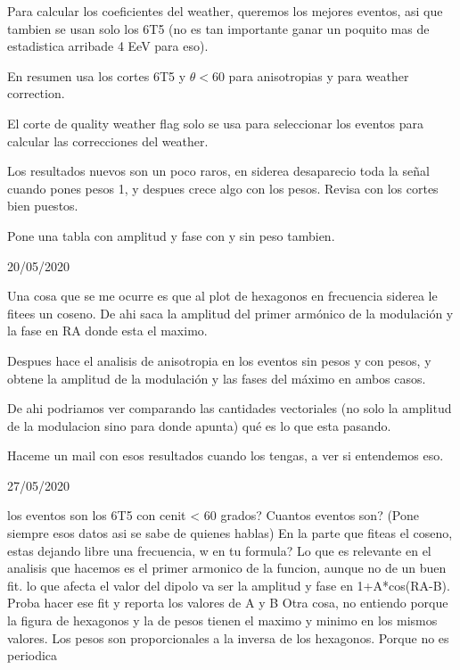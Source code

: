 \begin{itemize}
\done Para calcular los coeficientes del weather, queremos los mejores eventos, asi que tambien se usan solo los 6T5 (no es tan importante ganar un poquito mas de estadistica arribade 4 EeV para eso).

\done En resumen usa los cortes 6T5 y $\theta<60$ para anisotropias y para weather correction.

\done El corte de quality weather flag solo se usa para seleccionar los eventos para calcular las correcciones del weather.

\done Los resultados nuevos son un poco raros, en siderea desaparecio toda la señal cuando pones pesos 1, y despues crece algo con los pesos. Revisa con los cortes bien puestos.

\done Pone una tabla con amplitud y fase con y sin peso tambien.

\end{itemize}


20/05/2020

\begin{itemize}


\done Una cosa que se me ocurre es que al plot de hexagonos en frecuencia siderea le fitees un coseno. De ahi saca la amplitud del primer armónico de la modulación y la fase en RA donde esta el maximo.

\done Despues hace el analisis de anisotropia en los eventos sin pesos y con pesos, y obtene la amplitud de la modulación y las fases del máximo en ambos casos.

\done De ahi podriamos ver comparando las cantidades vectoriales (no solo la amplitud de la modulacion sino para donde apunta) qué es lo que esta pasando.

\done Haceme un mail con esos resultados cuando los tengas, a ver si entendemos eso.

\end{itemize}



27/05/2020

\begin{itemize}
	\done los eventos son los 6T5 con cenit < 60 grados? Cuantos eventos son? (Pone siempre esos datos asi se sabe de quienes hablas)
	\done En la parte que fiteas el coseno, estas dejando libre una frecuencia, w en tu formula? 
	\done Lo que es relevante en el analisis que hacemos es el primer armonico de la funcion, aunque no de un buen fit. lo que afecta el valor del dipolo va ser la amplitud y fase en 1+A*cos(RA-B). Proba hacer ese fit y reporta los valores de A y B
	\done Otra cosa, no entiendo porque la figura de hexagonos y la de pesos tienen el maximo y minimo en los mismos valores. Los pesos son proporcionales a la inversa de los hexagonos.
	\done Porque no es periodica
\end{itemize}



